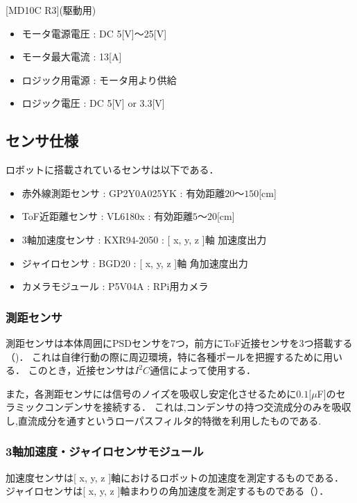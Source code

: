 \documentclass[11pt,a4]{jsarticle}
\begin{document}
    [MD10C R3](駆動用)
    \begin{itemize}
     \item モータ電源電圧 : DC 5[V]$〜$25[V]
     \item モータ最大電流 : 13[A]
     \item ロジック用電源 : モータ用より供給
     \item ロジック電圧   : DC 5[V] or 3.3[V]
    \end{itemize}


  \subsection{センサ仕様}
    ロボットに搭載されているセンサは以下である．
    \begin{itemize}
     \item 赤外線測距センサ : GP2Y0A025YK : 有効距離$20 〜 150$[cm]
     \item ToF近距離センサ : VL6180x    : 有効距離$5 〜 20$[cm]
     \item 3軸加速度センサ : KXR94-2050 : [ x, y, z ]軸 加速度出力
     \item ジャイロセンサ : BGD20 : [ x, y, z ]軸 角加速度出力
     \item カメラモジュール : P5V04A : RPi用カメラ
    \end{itemize}

    \subsubsection{測距センサ}
      測距センサは本体周囲にPSDセンサを7つ，前方にToF近接センサを3つ搭載する（)．
      これは自律行動の際に周辺環境，特に各種ポールを把握するために用いる．
      このとき，近接センサは$I^2 C$通信によって使用する．

      また，各測距センサには信号のノイズを吸収し安定化させるために$0.1[\mu $F]のセラミックコンデンサを接続する．
      これは,コンデンサの持つ交流成分のみを吸収し,直流成分を通すというローパスフィルタ的特徴を利用したものである.


    \subsubsection{3軸加速度・ジャイロセンサモジュール}
      加速度センサは[ x, y, z ]軸におけるロボットの加速度を測定するものである．
      ジャイロセンサは[ x, y, z ]軸まわりの角加速度を測定するものである（）．
\end{document}

